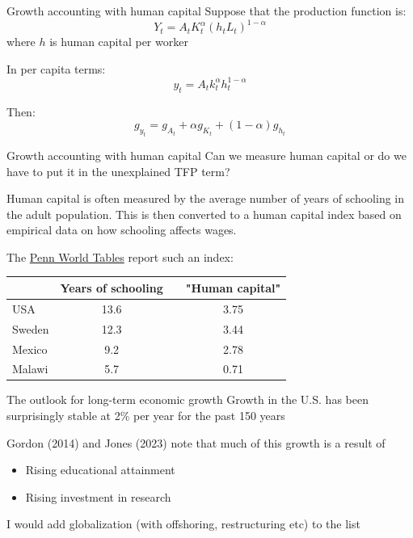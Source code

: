 \documentclass[10pt,handout]{beamer}
\begin{document}
\begin{frame}{Growth accounting with human capital}
    Suppose that the production function is:
    \begin{equation*}
        Y_t = A_t K_t^\alpha (h_tL_t)^{1-\alpha}
    \end{equation*} 
    where $h$ is human capital per worker\bigskip

    In per capita terms:
    \begin{equation*}
        y_t = A_t k_t^\alpha h_t^{1-\alpha} 
    \end{equation*} \medskip

    Then:
    \begin{equation*}
        g_{y_t} = g_{A_t} + \alpha g_{K_t} + (1-\alpha) g_{h_t}
    \end{equation*} 
\end{frame}


\begin{frame}{Growth accounting with human capital}
    Can we measure human capital or do we have to put it in the unexplained TFP term? \medskip

    Human capital is often measured by the average number of years of schooling in the adult population. This is then converted to a human capital index based on empirical data on how schooling affects wages.\medskip

    The \href{https://www.rug.nl/ggdc/productivity/pwt/?lang=en}{Penn World Tables} report such an index:\smallskip

    \begin{table}
    \small{
        \centering
        \begin{tabular}{lccc}
             & Years of schooling &  & "Human capital" \\ \hline
            USA  & 13.6 & & 3.75 \\
            Sweden & 12.3 & & 3.44 \\
            Mexico & 9.2 & & 2.78 \\
            Malawi & 5.7 & & 0.71
        \end{tabular}
        }
    \end{table}
\end{frame}


\begin{frame}{The outlook for long-term economic growth}
    Growth in the U.S. has been surprisingly stable at 2\% per year for the past 150 years\bigskip

    Gordon (2014) and Jones (2023) note that much of this growth is a result of
    \begin{itemize}
        \item Rising educational attainment
        \item Rising investment in research
    \end{itemize}\medskip

    I would add globalization (with offshoring, restructuring etc) to the list 
\end{frame}
\end{document}
